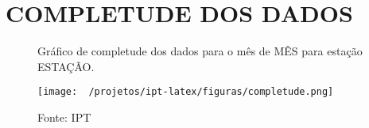 \section{COMPLETUDE DOS DADOS}

\begin{figure}[htb!]
    \centering
	\captionsetup{justification=raggedright, singlelinecheck=false, width=1\textwidth}
    \caption{Gráfico de completude dos dados para o mês de MÊS para estação ESTAÇÃO.}
    \texttt{[image: ~/projetos/ipt-latex/figuras/completude.png]} %
    \caption*{Fonte: IPT}
    \label{fig:completude}
\end{figure}

